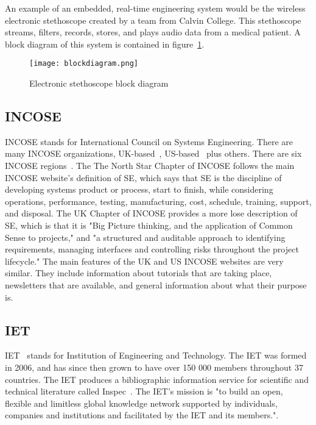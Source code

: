 \documentclass[a4paper,12pt]{article}
\begin{document}
An example of an embedded, real-time engineering system would be the wireless electronic stethoscope created by a team from Calvin College.  This stethoscope streams, filters, records, stores, and plays audio data from a medical patient\cite{steth}.  A block diagram of this system is contained in figure~\ref{fig1}.
\begin{center}
\begin{figure}[ht]
	\begin{center}
		\caption{Electronic stethoscope block diagram}
		\texttt{[image: blockdiagram.png]}
	\end{center}
	\label{fig1}
\end{figure}
\end{center}

\subsection{INCOSE}
INCOSE stands for International Council on Systems Engineering.  There are many INCOSE organizations, UK-based~\cite{INCOSE-UK}, US-based~\cite{INCOSE-US} plus others.   There are six INCOSE regions~\cite{regions}.  The The North Star Chapter of INCOSE follows the main INCOSE website's definition of SE, which says that SE is the discipline of developing systems product or process, start to finish, while considering operations, performance, testing, manufacturing, cost, schedule, training, support, and disposal.\cite{SEns}\cite{SEdef}  The UK Chapter of INCOSE provides a more lose description of SE, which is that it is "Big Picture thinking, and the application of Common Sense to projects," and "a structured and auditable approach to identifying requirements, managing interfaces and controlling risks throughout the project lifecycle."\cite{UKdef}  The main features of the UK and US INCOSE websites are very similar. They include information about tutorials that are taking place, newsletters that are available, and general information about what their purpose is. 

\subsection{IET}
IET~\cite{IET} stands for Institution of Engineering and Technology.  The IET was formed in 2006, and has since then grown to have over 150 000 members throughout 37 countries.  The IET produces a bibliographic information service for scientific and technical literature called Inspec~\cite{Inspec}.  The IET's mission is "to build an open, flexible and limitless global knowledge network supported by individuals, companies and institutions and facilitated by the IET and its members."\cite{IET-Mission}.
\end{document}
